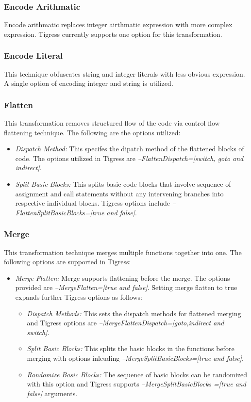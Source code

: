 \subsubsection{Encode Arithmatic}
Encode arithmatic replaces integer airthmatic expression with more complex expression. Tigress currently supports one option for this transformation. 

\subsubsection{Encode Literal}
This technique obfuscates string and integer literals with less obvious expression. A single option of encoding integer and string is utilized.

\subsubsection{Flatten}
This transformation removes structured flow of the code via control flow flattening technique. The following are the options utilized:
\begin{itemize}
\item \textit{Dispatch Method:} This specifes the dipatch method of the flattened blocks of code. The options utilized in Tigress are \textit{--FlattenDispatch=[switch, goto and indirect]}.
\item \textit{Split Basic Blocks:} This splits basic code blocks that involve sequence of assignment and call statements without any intervening branches into respective individual blocks. Tigress options include \textit{--FlattenSplitBasicBlocks=[true and false]}.
\end{itemize}

\subsubsection{Merge}
This transformation technique merges multiple functions together into one. The following options are supported in Tigress:
\begin{itemize}
\item \textit{Merge Flatten:} Merge supports flattening before the merge. The options provided are \textit{--MergeFlatten=[true and false]}. Setting merge flatten to true expands further Tigress options as follows: 
\begin{itemize}
\item \textit{Dispatch Methods:} This sets the dispatch methods for flattened merging and Tigress options are \textit{--MergeFlattenDispatch=[goto,indirect and switch]}.
\item \textit{Split Basic Blocks:} This splits the basic blocks in the functions before merging with options inlcuding \textit{--MergeSplitBasicBlocks=[true and false]}.
\item \textit{Randomize Basic Blocks:} The sequence of basic blocks can be randomized with this option and Tigress supports \textit{--MergeSplitBasicBlocks	=[true and false]} arguments. 
\end{itemize}
\end{itemize}

